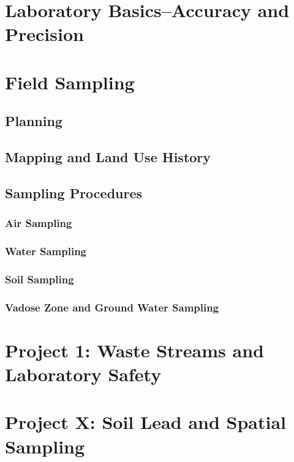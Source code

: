 \documentclass{tufte-book}\usepackage[]{graphicx}\usepackage[]{xcolor}
\begin{document}
\chapter{Laboratory Basics--Accuracy and Precision}

\chapter{Field Sampling}

\section{Planning}

\section{Mapping and Land Use History}

\section{Sampling Procedures}

\subsection{Air Sampling}

\subsection{Water Sampling}

\subsection{Soil Sampling}


\subsection{Vadose Zone and Ground Water Sampling}

\chapter{Project 1: Waste Streams and Laboratory Safety}

\chapter{Project X: Soil Lead and Spatial Sampling}
\end{document}
